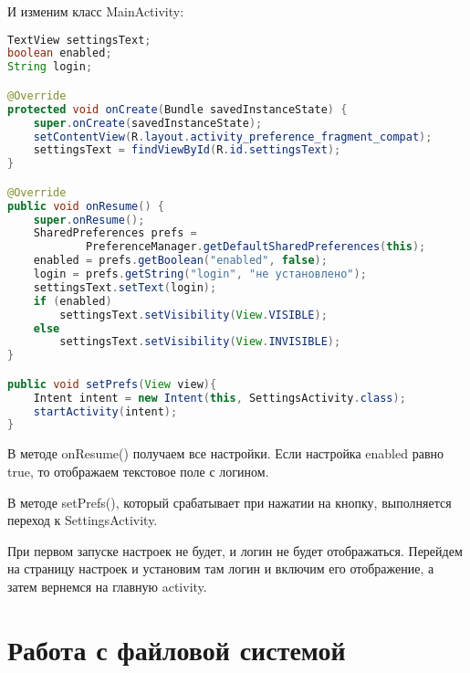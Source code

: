И изменим класс MainActivity:

\begin{lstlisting}[language=Java
	, label=lst:
	]
TextView settingsText;
boolean enabled;
String login;

@Override
protected void onCreate(Bundle savedInstanceState) {
	super.onCreate(savedInstanceState);
	setContentView(R.layout.activity_preference_fragment_compat);
	settingsText = findViewById(R.id.settingsText);
}

@Override
public void onResume() {
	super.onResume();
	SharedPreferences prefs =
			PreferenceManager.getDefaultSharedPreferences(this);
	enabled = prefs.getBoolean("enabled", false);
	login = prefs.getString("login", "не установлено");
	settingsText.setText(login);
	if (enabled)
		settingsText.setVisibility(View.VISIBLE);
	else
		settingsText.setVisibility(View.INVISIBLE);
}

public void setPrefs(View view){
	Intent intent = new Intent(this, SettingsActivity.class);
	startActivity(intent);
}
\end{lstlisting}

В методе onResume() получаем все настройки. Если настройка enabled равно
true, то отображаем текстовое поле с логином.\par
В методе setPrefs(), который срабатывает при нажатии на кнопку,
выполняется переход к SettingsActivity.\par
При первом запуске настроек не будет, и логин не будет отображаться.
Перейдем на страницу настроек и установим там логин и включим его
отображение, а затем вернемся на главную activity.

\section{Работа с файловой системой}

